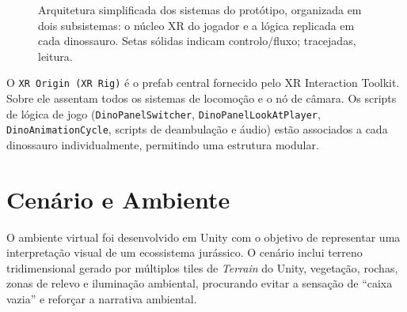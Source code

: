 \documentclass[a4paper,11pt]{report}
\newcommand{\code}[1]{\texttt{#1}}
\begin{document}
\begin{figure}[H]
{%
}
\caption{Arquitetura simplificada dos sistemas do protótipo, organizada em dois
         subsistemas: o núcleo XR do jogador e a lógica replicada em cada
         dinossauro. Setas sólidas indicam controlo/fluxo; tracejadas, leitura.}
\label{fig:arch}
\end{figure}

O \code{XR Origin (XR Rig)} é o prefab central fornecido pelo XR Interaction
Toolkit. Sobre ele assentam todos os sistemas de locomoção e o nó de câmara.
Os scripts de lógica de jogo (\code{DinoPanelSwitcher}, \code{DinoPanelLookAtPlayer},
\code{DinoAnimationCycle}, scripts de deambulação e áudio) estão associados a
cada dinossauro individualmente, permitindo uma estrutura modular.

\section{Cenário e Ambiente}

O ambiente virtual foi desenvolvido em Unity com o objetivo de representar uma
interpretação visual de um ecossistema jurássico. O cenário inclui terreno
tridimensional gerado por múltiplos tiles de \textit{Terrain} do Unity,
vegetação, rochas, zonas de relevo e iluminação ambiental, procurando evitar
a sensação de ``caixa vazia'' e reforçar a narrativa ambiental.
\end{document}
